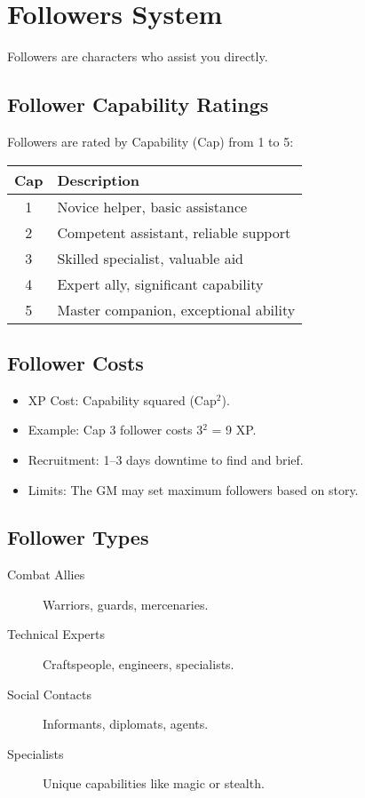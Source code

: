 \documentclass[11pt,twoside,openany]{book}
\begin{document}
\section*{Followers System} 

Followers are characters who assist you directly.

\subsection*{Follower Capability Ratings}

Followers are rated by Capability (Cap) from 1 to 5:

\begin{center}
\begin{tabular}{|c|l|}
\hline
\textbf{Cap} & \textbf{Description} \\
\hline
1 & Novice helper, basic assistance \\
2 & Competent assistant, reliable support \\
3 & Skilled specialist, valuable aid \\
4 & Expert ally, significant capability \\
5 & Master companion, exceptional ability \\
\hline
\end{tabular}
\end{center}

\subsection*{Follower Costs}

\begin{itemize}
\item XP Cost: Capability squared (Cap$^2$).
\item Example: Cap 3 follower costs 3$^2$ = 9 XP.
\item Recruitment: 1–3 days downtime to find and brief.
\item Limits: The GM may set maximum followers based on story.
\end{itemize}

\subsection*{Follower Types}

\begin{description}
\item[Combat Allies] Warriors, guards, mercenaries.
\item[Technical Experts] Craftspeople, engineers, specialists.
\item[Social Contacts] Informants, diplomats, agents.
\item[Specialists] Unique capabilities like magic or stealth.
\end{description}
\end{document}
